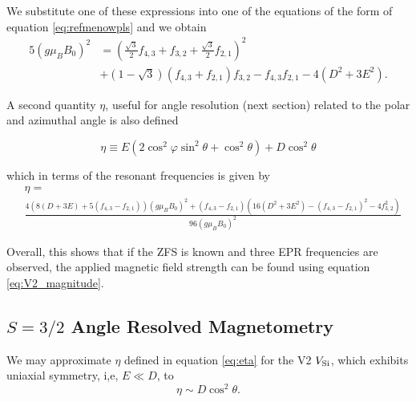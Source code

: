 We substitute one of these expressions into one of the equations of the form of equation \ref{eq:refmenowpls} and we obtain 
\begin{equation}
    \begin{align}
        5(g\mu_B B_0)^2 &=\left(\frac{\sqrt{3}}{2}f_{4,3} + f_{3,2}  + \frac{\sqrt{3}}{2}f_{2,1}\right)^2 \\ 
        &+(1 - \sqrt{3}) (f_{4,3} + f_{2,1})f_{3,2} - f_{4,3}f_{2,1} - 4(D^2 + 3E^2).
    \end{align}
    \label{eq:V2_magnitude}
\end{equation}

A second quantity $\eta$, useful for angle resolution (next section) related to the polar and azimuthal angle is also defined

\begin{equation}
        \eta \equiv E(2\cos^2\varphi \sin^2 \theta + \cos^2\theta) + D\cos^2 \theta 
    \label{eq:eta}
\end{equation}

which in terms of the resonant frequencies is given by 
\begin{equation}
    \begin{align}
    &\eta = \\ 
    &\frac{4\left(8(D + 3E) + 5(f_{4,3}-f_{2,1})\right)(g\mu_B B_0)^2 + (f_{4,3} - f_{2,1})\left(16(D^2 + 3E^2) - (f_{4,3}-f_{2,1})^2 - 4f_{3,2}^2\right)}{96(g\mu_B B_0)^2}
\end{align}
    \label{eq:eta_resonant}

\end{equation}


Overall, this shows that if the ZFS is known and three EPR frequencies are observed, the applied magnetic field strength can be found using equation \ref{eq:V2_magnitude}.




\subsection{$S=3/2$ Angle Resolved Magnetometry}
We may approximate $\eta$ defined in equation \ref{eq:eta} for the V2 $V_{\ce{Si}}$, which exhibits uniaxial symmetry, i,e, $E\ll D$, to 
\begin{equation}
    \eta \sim D \cos^2 \theta. 
    \label{eq:}
\end{equation}

